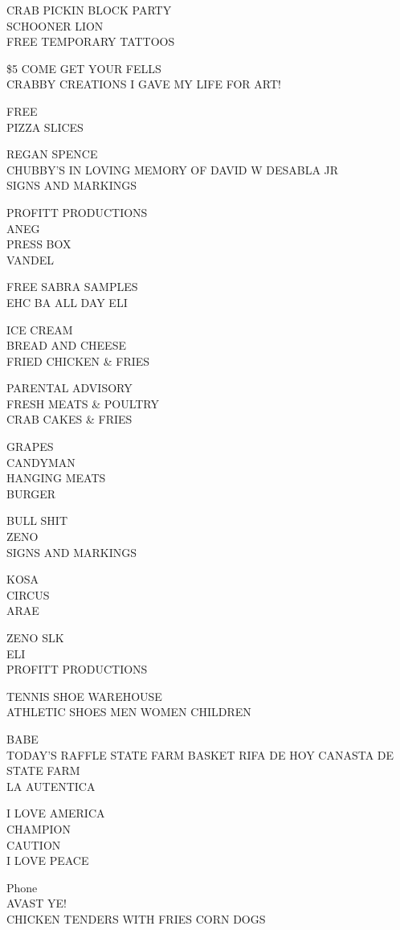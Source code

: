 \documentclass[10pt,letterpaper]{article}
\begin{document}
CRAB PICKIN BLOCK PARTY\\
SCHOONER LION\\
FREE TEMPORARY TATTOOS

\$5 COME GET YOUR FELLS\\
CRABBY CREATIONS I GAVE MY LIFE FOR ART!

FREE\\
PIZZA SLICES

REGAN SPENCE\\
CHUBBY'S IN LOVING MEMORY OF DAVID W DESABLA JR\\
SIGNS AND MARKINGS

PROFITT PRODUCTIONS\\
ANEG\\
PRESS BOX\\
VANDEL

FREE SABRA SAMPLES\\
EHC BA ALL DAY ELI

ICE CREAM\\
BREAD AND CHEESE\\
FRIED CHICKEN \& FRIES

PARENTAL ADVISORY\\
FRESH MEATS \& POULTRY\\
CRAB CAKES \& FRIES

GRAPES\\
CANDYMAN\\
HANGING MEATS\\
BURGER

BULL SHIT\\
ZENO\\
SIGNS AND MARKINGS

KOSA\\
CIRCUS\\
ARAE

ZENO SLK\\
ELI\\
PROFITT PRODUCTIONS

TENNIS SHOE WAREHOUSE\\
ATHLETIC SHOES MEN WOMEN CHILDREN

BABE\\
TODAY'S RAFFLE STATE FARM BASKET RIFA DE HOY CANASTA DE STATE FARM\\
LA AUTENTICA

I LOVE AMERICA\\
CHAMPION\\
CAUTION\\
I LOVE PEACE

Phone\\
AVAST YE!\\
CHICKEN TENDERS WITH FRIES CORN DOGS
\end{document}
